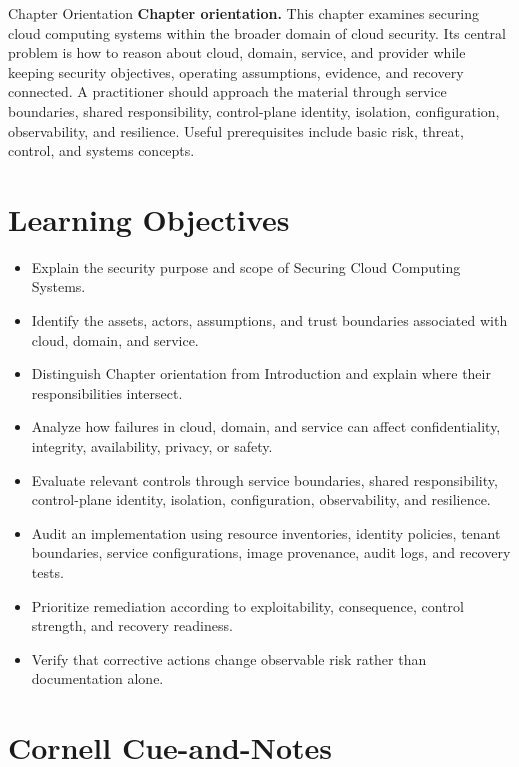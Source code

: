\documentclass[11pt,letterpaper]{article}
\title{\CornellDocumentTitle}
\author{}
\date{}
\begin{document}
\maketitle
\begin{CornellOverviewBox}{Chapter Orientation}
\textbf{Chapter orientation.} This chapter examines securing cloud computing systems within the broader domain of cloud security. Its central problem is how to reason about cloud, domain, service, and provider while keeping security objectives, operating assumptions, evidence, and recovery connected. A practitioner should approach the material through service boundaries, shared responsibility, control-plane identity, isolation, configuration, observability, and resilience. Useful prerequisites include basic risk, threat, control, and systems concepts.
\end{CornellOverviewBox}
\section*{Learning Objectives}
\begin{itemize}
\item Explain the security purpose and scope of Securing Cloud Computing Systems.
\item Identify the assets, actors, assumptions, and trust boundaries associated with cloud, domain, and service.
\item Distinguish Chapter orientation from Introduction and explain where their responsibilities intersect.
\item Analyze how failures in cloud, domain, and service can affect confidentiality, integrity, availability, privacy, or safety.
\item Evaluate relevant controls through service boundaries, shared responsibility, control-plane identity, isolation, configuration, observability, and resilience.
\item Audit an implementation using resource inventories, identity policies, tenant boundaries, service configurations, image provenance, audit logs, and recovery tests.
\item Prioritize remediation according to exploitability, consequence, control strength, and recovery readiness.
\item Verify that corrective actions change observable risk rather than documentation alone.
\end{itemize}
\section*{Cornell Cue-and-Notes}
\end{document}
